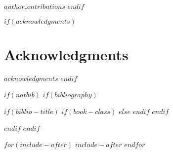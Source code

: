 \documentclass[webpdf$if(papersize)$,$papersize$$else$,large$endif$$if(document-style)$,$document-style$$else$,contemporary$endif$$if(numbersections)$$else$,unnumsec$endif$$if(namedate)$,namedate$endif$$if(classoptions)$,$for(classoptions)$$classoptions$$sep$,$endfor$$endif$]{oup-authoring-template}
\theoremstyle{thmstyleone}%
\theoremstyle{thmstyletwo}%
\theoremstyle{thmstylethree}%
\begin{document}
$author_contributions$
$endif$

$if(acknowledgments)$
\section{Acknowledgments}

$acknowledgments$
$endif$

$if(natbib)$
$if(bibliography)$

$if(biblio-title)$
$if(book-class)$
\renewcommand\bibname{$biblio-title$}
$else$
\renewcommand\refname{$biblio-title$}
$endif$
$endif$




$endif$
$endif$




$for(include-after)$
$include-after$
$endfor$
\end{document}
